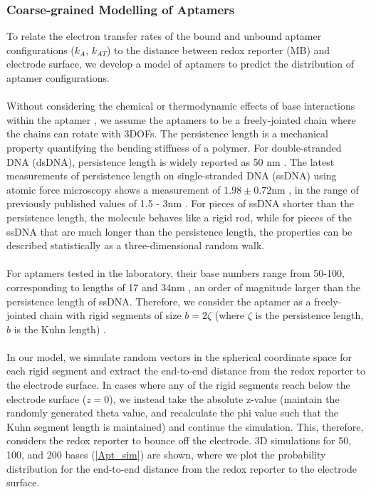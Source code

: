 \subsubsection{Coarse-grained Modelling of Aptamers}
To relate the electron transfer rates of the bound and unbound aptamer configurations ($k_{A}$, $k_{AT}$) to the distance between redox reporter (MB) and electrode surface, we develop a model of aptamers to predict the distribution of aptamer configurations.\\\\ 
Without considering the chemical or thermodynamic effects of base interactions within the aptamer \cite{feigon1996aptamer}, we assume the aptamers to be a freely-jointed chain where the chains can rotate with 3DOFs.
The persistence length is a mechanical property quantifying the bending stiffness of a polymer. For double-stranded DNA (dsDNA), persistence length is widely reported as 50 nm \cite{bloomfielduniversity,marko1995stretching}. The latest measurements of persistence length on single-stranded DNA (ssDNA) using atomic force microscopy shows a measurement of $1.98 \pm 0.72$nm \cite{roth2018measuring}, in the range of previously published values of 1.5 - 3nm \cite{murphy2004probing,chi2013persistence}. For pieces of ssDNA shorter than the persistence length, the molecule behaves like a rigid rod, while for pieces of the ssDNA that are much longer than the persistence length, the properties can be described statistically as a three-dimensional random walk.\\\\
For aptamers tested in the laboratory, their base numbers range from 50-100, corresponding to lengths of 17 and 34nm \cite{alberts2014molecular}, an order of magnitude larger than the persistence length of ssDNA. Therefore, we consider the aptamer as a freely-jointed chain with rigid segments of size $b = 2\zeta$ (where $\zeta$ is the persistence length, $b$ is the Kuhn length) \cite{strobl1997physics}.\\\\
In our model, we simulate random vectors in the spherical coordinate space for each rigid segment and extract the end-to-end distance from the redox reporter to the electrode surface. In cases where any of the rigid segments reach below the electrode surface ($z=0$), we instead take the absolute z-value (maintain the randomly generated theta value, and recalculate the phi value such that the Kuhn segment length is maintained) and continue the simulation. This, therefore, considers the redox reporter to bounce off the electrode. 3D simulations for 50, 100, and 200 bases (\autoref{Apt_sim}) are shown, where we plot the probability distribution for the end-to-end distance from the redox reporter to the electrode surface. \\\\
